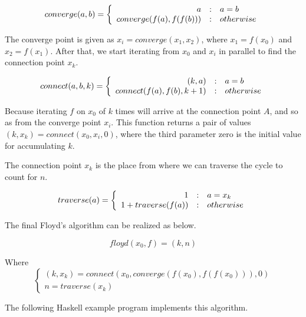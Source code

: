 \documentclass{article}
\begin{document}
\begin{equation}
converge(a, b) = \left \{
  \begin{array}
  {r@{\quad:\quad}l}
  a & a = b \\
  converge(f(a), f(f(b))) & otherwise
  \end{array}
\right.
\end{equation}

The converge point is given as $x_i = converge(x_1, x_2)$, where $x_1 = f(x_0)$ and $x_2 = f(x_1)$.
After that, we start iterating from $x_0$ and $x_i$ in parallel to find the connection point $x_k$.

\begin{equation}
connect(a, b, k) = \left \{
  \begin{array}
  {r@{\quad:\quad}l}
  (k, a) & a = b \\
  connect(f(a), f(b), k + 1) & otherwise
  \end{array}
\right.
\end{equation}

Because iterating $f$ on $x_0$ of $k$ times will arrive at the connection point $A$, and so as
from the converge point $x_i$. This function returns a pair of values $(k, x_k) = connect(x_0, x_i, 0)$, where the third parameter zero is the initial value for accumulating $k$.

The connection point $x_k$ is the place from where we can traverse the cycle to
count for $n$.

\begin{equation}
traverse(a) =  \left \{
  \begin{array}
  {r@{\quad:\quad}l}
  1 & a = x_k \\
  1 + traverse(f(a)) & otherwise
  \end{array}
\right.
\end{equation}

The final Floyd's algorithm can be realized as below.

\begin{equation}
floyd(x_0, f) = (k, n)
\end{equation}

Where
\[
\left \{
\begin{array}{l}
(k, x_k) = connect(x_0, converge(f(x_0), f(f(x_0))), 0) \\
n = traverse(x_k)
\end{array}
\right .
\]

The following Haskell example program implements this algorithm.
\end{document}
